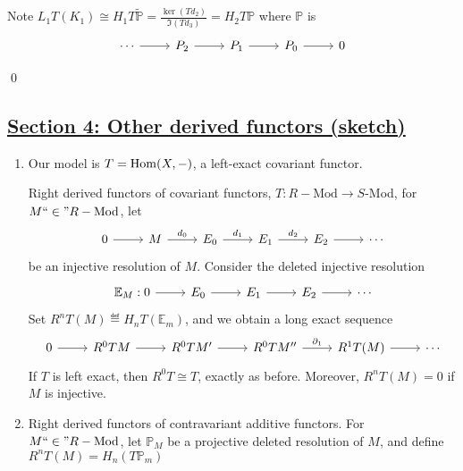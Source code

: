 \documentclass[x11names,reqno,14pt]{extarticle}
\newcommand{\fin}{``\in"}
\newcommand{\RMod}{R-\text{Mod}}
\renewcommand{\P}{\mathbb{P}}
\renewcommand{\E}{\mathbb{E}}
\begin{document}
Note $L_1T(K_1) \cong H_1T\tilde{\P} = \frac{\ker(Td_2)}{\Im(Td_3)} = H_2T\P$
where $\P$ is
\[
\begin{tikzcd}
\cdots\ar[r] & P_2 \ar[r] & P_1 \ar[r] & P_0 \ar[r] & 0 
\end{tikzcd}
\]

\qed

\subsection*{\underline{Section 4: Other derived functors (sketch)}}

\begin{enumerate}[label=(\alph*)]

\item Our model is $T = {\mathrm{Hom}}(X,-)$, a left-exact covariant functor.

Right derived functors of covariant functors, $T:\RMod\to S$-Mod, for $M \fin \RMod$, let 
\[
\begin{tikzcd}
0 \ar[r] & M \ar[r, "d_0"] & E_0 \ar[r, "d_1"] & E_1 \ar[r, "d_2"] & E_2 \ar[r] & \cdots
\end{tikzcd}
\]
be an injective resolution of $M$. Consider the deleted injective resolution
\[
\begin{tikzcd}
\E_M:0 \ar[r] & E_0 \ar[r] & E_1 \ar[r] & E_2 \ar[r] & \cdots 
\end{tikzcd}
\]
Set $R^nT(M) \eqdef H_nT(\E_m)$, and we obtain a long exact sequence
\[
\begin{tikzcd}
0 \ar[r] & R^0TM \ar[r] &R^0TM' \ar[r]& R^0TM'' \ar[r, "\del_1"]& R^1T(M) \ar[r] & \cdots 
\end{tikzcd}
\]
If $T$ is left exact, then $R^0T \cong T$, exactly as before. Moreover, $R^nT(M) = 0$ if $M$ is injective. 

\item Right derived functors of contravariant additive functors. For $M\fin\RMod$, let $\P_M$ be a projective deleted resolution of $M$, and define $R^nT(M) = H_n(T\P_m)$

\end{enumerate}
\end{document}

